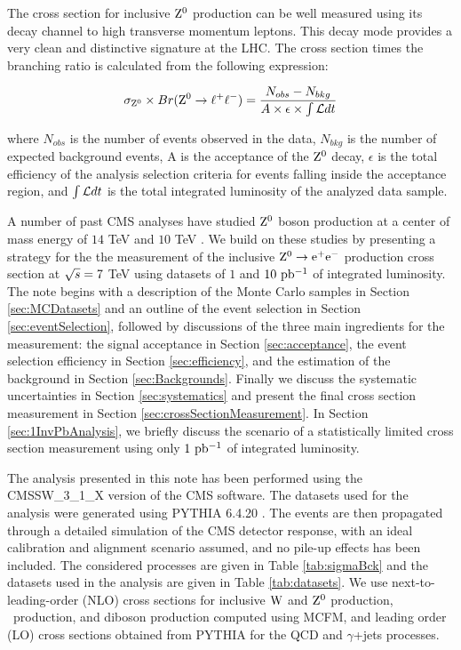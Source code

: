 \documentclass{cmspaper}
\begin{document}
The cross section for inclusive $\mathrm{Z^0}$ production can be well measured using its decay channel to high transverse momentum leptons. This decay mode provides a very clean and distinctive signature at the LHC. The cross section times the branching ratio is calculated from the following expression:

\begin{eqnarray}
  \label{eqn:CrossSectionFormula}  
\sigma_{\mathrm{Z^0}} \times Br(\mathrm{Z^0}\rightarrow\ell^{+}\ell^{-}) = \frac{N_{obs} - N_{bkg}}{A \times \epsilon \times \int {\cal L} dt}
\end{eqnarray}

where $N_{obs}$ is the number of events observed in the data, $N_{bkg}$ is the number of expected background events, A is the acceptance of the $\mathrm{Z^0}$ decay, $\epsilon$ is the total efficiency of the analysis selection criteria for events falling inside the acceptance region, and $\int {\cal L} dt$ is the total integrated luminosity of the analyzed data sample.

A number of past CMS analyses have studied $\mathrm{Z^0}$ boson production at a center of mass energy of $14$ TeV \cite{ZCrossSectionNote14TeV} and $10$ TeV \cite{ZCrossSectionNote10TeV}. We build on these studies by presenting a strategy for the the measurement of the inclusive $\mathrm{Z^0}\rightarrow\mathrm{e}^{+}\mathrm{e}^{-}$ production cross section at $\sqrt{s} = 7$ TeV using datasets of $1$ and $10\ \mathrm{pb^{-1}}$ of integrated luminosity. The note begins with a description of the Monte Carlo samples in Section \ref{sec:MCDatasets} and an outline of the event selection in Section \ref{sec:eventSelection}, followed by discussions of the three main ingredients for the measurement: the signal acceptance in Section \ref{sec:acceptance}, the event selection efficiency in Section \ref{sec:efficiency}, and the estimation of the background in Section \ref{sec:Backgrounds}. Finally we discuss the systematic uncertainties in Section \ref{sec:systematics} and present the final cross section measurement in Section \ref{sec:crossSectionMeasurement}. In Section \ref{sec:1InvPbAnalysis}, we briefly discuss the scenario of a statistically limited cross section measurement using only $1\ \mathrm{pb^{-1}}$ of integrated luminosity.

\label{sec:MCDatasets}
The analysis presented in this note has been performed using the CMSSW\_3\_1\_X version of the CMS software. The datasets used for the analysis were generated using PYTHIA 6.4.20 \cite{PythiaReference}. The events are then propagated through a detailed simulation of the CMS detector response, with an ideal calibration and alignment scenario assumed, and no pile-up effects has been included. The considered processes are given in Table \ref{tab:sigmaBck} and the datasets used in the analysis are given in Table \ref{tab:datasets}. We use next-to-leading-order (NLO) cross sections for inclusive $\mathrm{W}$ and $\mathrm{Z^0}$ production, \ttbar\ production, and diboson production computed using MCFM\cite{MCFMReference}, and leading order (LO) cross sections obtained from PYTHIA for the QCD and $\gamma$+jets processes.
\end{document}
